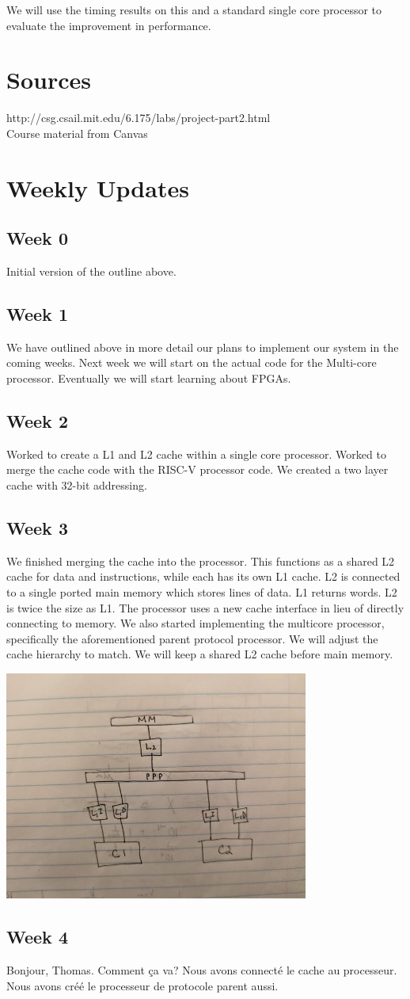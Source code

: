 \documentclass{article}
\begin{document}
We will use the timing results on this and a standard single core processor to evaluate the improvement in performance. 

\section{Sources}

http://csg.csail.mit.edu/6.175/labs/project-part2.html
\\
Course material from Canvas

\section{Weekly Updates}
\subsection{Week 0}
Initial version of the outline above.
\subsection{Week 1}
We have outlined above in more detail our plans to implement our system in the coming weeks. Next week we will start on the actual code for the Multi-core processor. Eventually we will start learning about FPGAs.
\subsection{Week 2}
Worked to create a L1 and L2 cache within a single core processor. Worked to merge the cache code with the RISC-V processor code. We created a two layer cache with 32-bit addressing.
\subsection{Week 3}
We finished merging the cache into the processor. This functions as a shared L2 cache for data and instructions, while each has its own L1 cache. L2 is connected to a single ported main memory which stores lines of data. L1 returns words. L2 is twice the size as L1. The processor uses a new cache interface in lieu of directly connecting to memory. We also started implementing the multicore processor, specifically the aforementioned parent protocol processor. We will adjust the cache hierarchy to match. We will keep a shared L2 cache before main memory. 

\includegraphics[width=10cm]{ppp.jpg}

\subsection{Week 4}
Bonjour, Thomas. Comment ça va? Nous avons connecté le cache au processeur. Nous avons créé le processeur de protocole parent aussi.
\end{document}
